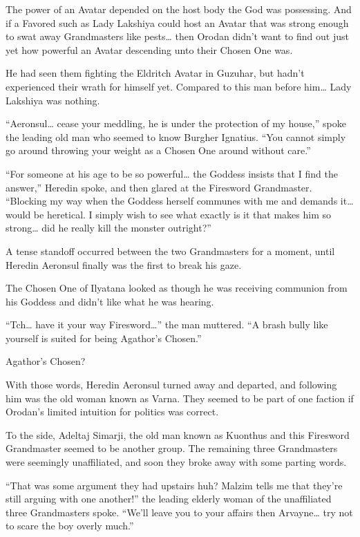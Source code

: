 \documentclass[a4paper,10pt]{book}
\begin{document}
The power of an Avatar depended on the host body the God was possessing. And if a Favored such as Lady Lakshiya could host an Avatar that was strong enough to swat away Grandmasters like pests… then Orodan didn’t want to find out just yet how powerful an Avatar descending unto their Chosen One was.\par
He had seen them fighting the Eldritch Avatar in Guzuhar, but hadn’t experienced their wrath for himself yet. Compared to this man before him… Lady Lakshiya was nothing.\par
“Aeronsul… cease your meddling, he is under the protection of my house,” spoke the leading old man who seemed to know Burgher Ignatius. “You cannot simply go around throwing your weight as a Chosen One around without care.”\par
“For someone at his age to be so powerful… the Goddess insists that I find the answer,” Heredin spoke, and then glared at the Firesword Grandmaster. “Blocking my way when the Goddess herself communes with me and demands it… would be heretical. I simply wish to see what exactly is it that makes him so strong… did he really kill the monster outright?”\par
A tense standoff occurred between the two Grandmasters for a moment, until Heredin Aeronsul finally was the first to break his gaze.\par
The Chosen One of Ilyatana looked as though he was receiving communion from his Goddess and didn’t like what he was hearing.\par
“Tch… have it your way Firesword…” the man muttered. “A brash bully like yourself is suited for being Agathor’s Chosen.”\par
Agathor’s Chosen?\par
With those words, Heredin Aeronsul turned away and departed, and following him was the old woman known as Varna. They seemed to be part of one faction if Orodan’s limited intuition for politics was correct.\par
To the side, Adeltaj Simarji, the old man known as Kuonthus and this Firesword Grandmaster seemed to be another group. The remaining three Grandmasters were seemingly unaffiliated, and soon they broke away with some parting words.\par
“That was some argument they had upstairs huh? Malzim tells me that they’re still arguing with one another!” the leading elderly woman of the unaffiliated three Grandmasters spoke. “We’ll leave you to your affairs then Arvayne… try not to scare the boy overly much.”\par
\end{document}
